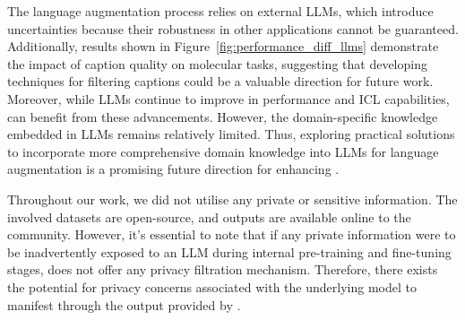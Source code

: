 The language augmentation process relies on external LLMs, which introduce uncertainties because their robustness in other applications cannot be guaranteed. 
Additionally, results shown in Figure~\ref{fig:performance_diff_llms} demonstrate the impact of caption quality on molecular tasks, suggesting that developing techniques for filtering captions could be a valuable direction for future work.
% 
Moreover, while LLMs continue to improve in performance and ICL capabilities, \newmodel can benefit from these advancements. 
However, the domain-specific knowledge embedded in LLMs remains relatively limited. 
Thus, exploring practical solutions to incorporate more comprehensive domain knowledge into LLMs for language augmentation is a promising future direction for enhancing \pipeline.

Throughout our work, we did not utilise any private or sensitive information.
The involved datasets are open-source, and outputs are available online to the community. 
However, it's essential to note that if any private information were to be inadvertently exposed to an LLM during internal pre-training and fine-tuning stages, \pipeline does not offer any privacy filtration mechanism.
Therefore, there exists the potential for privacy concerns associated with the underlying model to manifest through the output provided by \pipeline. 
